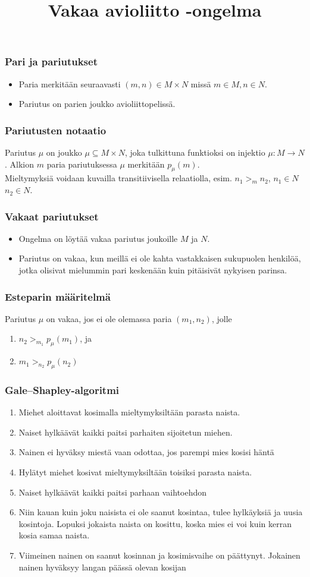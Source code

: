 \documentclass{beamer}
\title{Vakaa avioliitto -ongelma}
\begin{document}
	\frame{\titlepage}
	\begin{frame}
    \frametitle{Pari ja pariutukset}
    \begin{itemize}
		\item Paria merkitään seuraavasti $(m, n) \in M \times N$ missä $m \in M, n \in N$.
		\item  Pariutus on parien joukko avioliittopelissä.
    \end{itemize}
  \end{frame}
  \begin{frame}
  	\frametitle{Pariutusten notaatio}
  	Pariutus $\mu$ on joukko $\mu \subseteq M \times N$, joka tulkittuna funktioksi on injektio $\mu: M \rightarrow N$. Alkion $m$ paria pariutuksessa $\mu$ merkitään $p_{\mu}(m)$. \\Mieltymyksiä voidaan kuvailla transitiivisella relaatiolla, esim. $n_1 >_{m} n_2$, $n_1 \in N$ $n_2 \in N$.
  \end{frame}
  \begin{frame}
    \frametitle{Vakaat pariutukset}
    \begin{itemize}
		\item Ongelma on löytää vakaa pariutus joukoille $M$ ja $N$.
		\item Pariutus on vakaa, kun meillä ei ole kahta vastakkaisen sukupuolen henkilöä, jotka olisivat mielummin pari keskenään kuin pitäisivät nykyisen parinsa. 
    \end{itemize}
  \end{frame}
  \begin {frame}
  	\frametitle{Esteparin määritelmä}
  	Pariutus $\mu$ on vakaa, jos ei ole olemassa paria $(m_{1}, n_{2})$, jolle
  	\begin{enumerate}
  		\item $n_2 >_{m_{1}} p_{\mu}(m_1)$, ja
  		\item $m_1 >_{n_{2}} p_{\mu}(n_2)$
  	\end{enumerate}
  \end{frame}
  \begin{frame}
    \frametitle{Gale--Shapley-algoritmi}
    \begin{enumerate}
	\item Miehet aloittavat kosimalla mieltymyksiltään parasta naista.
	\item Naiset hylkäävät kaikki paitsi parhaiten sijoitetun miehen.
	\item Nainen ei hyväksy miestä vaan odottaa, jos parempi mies kosisi häntä
	\item Hylätyt miehet kosivat mieltymyksiltään toisiksi parasta naista.
	\item Naiset hylkäävät kaikki paitsi parhaan vaihtoehdon
	\item Niin kauan kuin joku naisista ei ole saanut kosintaa, tulee hylkäyksiä ja uusia kosintoja. Lopuksi jokaista naista on kosittu, koska mies ei voi kuin kerran kosia samaa naista.
	\item Viimeinen nainen on saanut kosinnan ja kosimisvaihe on päättynyt. Jokainen nainen hyväksyy langan päässä olevan kosijan
\end{enumerate}
  \end{frame}
\end{document}
